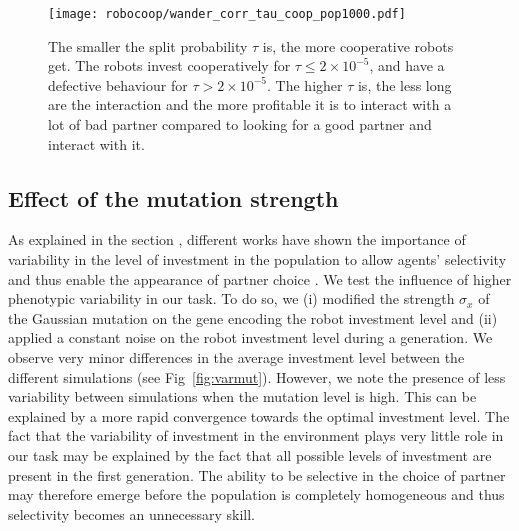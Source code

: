 \begin{figure}[tbhp]
    \begin{center}
        \texttt{[image: robocoop/wander\_corr\_tau\_coop\_pop1000.pdf]}
        \vskip 0.25cm
        \caption{The smaller the split probability $\tau$ is, the more cooperative robots get. The robots invest cooperatively for $\tau \leq 2\times 10 ^{-5}$, and have a defective behaviour for $\tau > 2 \times 10^{-5}$. The higher $\tau$ is, the less long are the interaction and the more profitable it is to interact with a lot of bad partner compared to looking for a good partner and interact with it.
        }
        \label{fig:corr_tau_comp}
    \end{center}
\end{figure}


\subsection{Effect of the mutation strength}

As explained in the section , different works have shown the importance of variability in the level of investment in the population to allow agents' selectivity and thus enable the appearance of partner choice \citep{McNamara2010c}.
We test the influence of higher phenotypic variability in our task. %
To do so, we (i) modified the strength $\sigma_x$ of the Gaussian mutation on the gene encoding the robot investment level and (ii) applied a constant noise on the robot investment level during a generation. %
We observe very minor differences in the average investment level between the different simulations (see Fig~\ref{fig:varmut}). However, we note the presence of less variability between simulations when the mutation level is high. This can be explained by a more rapid convergence towards the optimal investment level. %
The fact that the variability of investment in the environment plays very little role in our task may be explained by the fact that all possible levels of investment are present in the first generation. The ability to be selective in the choice of partner may therefore emerge before the population is completely homogeneous and thus selectivity becomes an unnecessary skill. %



